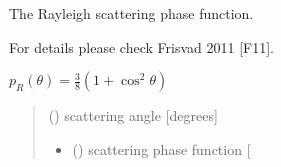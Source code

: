 \documentclass[letterpaper,10pt,english]{sphinxmanual}
\begin{document}

\begin{fulllineitems}
\label{\detokenize{06_anisotropy_factor:skinoptics.anisotropy_factor.ptheta_R}}
\pysigstartsignatures
{}
\pysigstopsignatures
\begin{DUlineblock}{0em}
\item[] The Rayleigh scattering phase function.
\item[] For details please check Frisvad 2011 {[}F11{]}.
\end{DUlineblock}

\sphinxAtStartPar
\(p_{R}(\theta) = \frac{3}{8}(1 + \cos^2\theta)\)
\begin{quote}\begin{description}
\sphinxAtStartPar
{} () \textendash{} scattering angle {[}degrees{]}

\sphinxAtStartPar
\begin{itemize}
\item {} 
\sphinxAtStartPar
{} () \textendash{} scattering phase function {[}\sphinxhyphen{}{]}

\end{itemize}


\end{description}\end{quote}

\end{fulllineitems}

\end{document}
